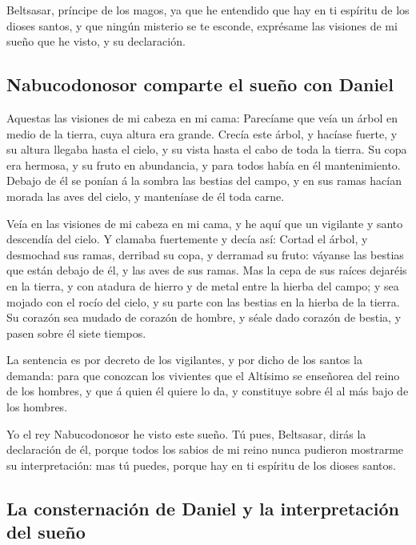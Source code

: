  Beltsasar, príncipe de los magos, ya que he entendido que
hay en ti espíritu de los dioses santos, y que ningún misterio se te
esconde, exprésame las visiones de mi sueño que he visto, y su
declaración.

\hypertarget{nabucodonosor-comparte-el-sueuxf1o-con-daniel}{%
\subsection{Nabucodonosor comparte el sueño con
Daniel}\label{nabucodonosor-comparte-el-sueuxf1o-con-daniel}}

 Aquestas las visiones de mi cabeza en mi cama: Parecíame
que veía un árbol en medio de la tierra, cuya altura era grande.
 Crecía este árbol, y hacíase fuerte, y su altura llegaba
hasta el cielo, y su vista hasta el cabo de toda la tierra.
 Su copa era hermosa, y su fruto en abundancia, y para
todos había en él mantenimiento. Debajo de él se ponían á la sombra las
bestias del campo, y en sus ramas hacían morada las aves del cielo, y
manteníase de él toda carne.

 Veía en las visiones de mi cabeza en mi cama, y he aquí
que un vigilante y santo descendía del cielo.  Y clamaba
fuertemente y decía así: Cortad el árbol, y desmochad sus ramas,
derribad su copa, y derramad su fruto: váyanse las bestias que están
debajo de él, y las aves de sus ramas.  Mas la cepa de
sus raíces dejaréis en la tierra, y con atadura de hierro y de metal
entre la hierba del campo; y sea mojado con el rocío del cielo, y su
parte con las bestias en la hierba de la tierra.  Su
corazón sea mudado de corazón de hombre, y séale dado corazón de bestia,
y pasen sobre él siete tiempos.

 La sentencia es por decreto de los vigilantes, y por
dicho de los santos la demanda: para que conozcan los vivientes que el
Altísimo se enseñorea del reino de los hombres, y que á quien él quiere
lo da, y constituye sobre él al más bajo de los hombres.

 Yo el rey Nabucodonosor he visto este sueño. Tú pues,
Beltsasar, dirás la declaración de él, porque todos los sabios de mi
reino nunca pudieron mostrarme su interpretación: mas tú puedes, porque
hay en ti espíritu de los dioses santos.

\hypertarget{la-consternaciuxf3n-de-daniel-y-la-interpretaciuxf3n-del-sueuxf1o}{%
\subsection{La consternación de Daniel y la interpretación del
sueño}\label{la-consternaciuxf3n-de-daniel-y-la-interpretaciuxf3n-del-sueuxf1o}}

